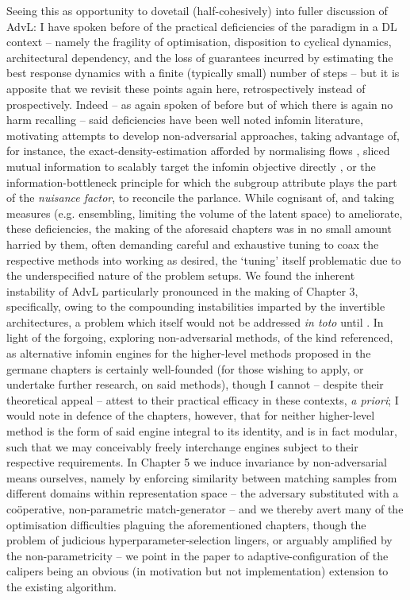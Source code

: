 %
Seeing this as opportunity to dovetail (half-cohesively) into fuller discussion of AdvL: I have
spoken before of the practical deficiencies of the paradigm in a DL context -- namely the fragility
of optimisation, disposition to cyclical dynamics, architectural dependency, and the loss of
guarantees incurred by estimating the best response dynamics with a finite (typically small) number
of steps -- but it is apposite that we revisit these points again here, retrospectively instead of
prospectively.
%
Indeed -- as again spoken of before but of which there is again no harm recalling -- said
deficiencies have been well noted infomin literature, motivating attempts to develop
non-adversarial approaches, taking advantage of, for instance, the exact-density-estimation
afforded by normalising flows \citep{balunovic2021fair}, sliced mutual information
\citep{goldfeld2021sliced} to scalably target the infomin objective directly
\citep{chen2022scalable}, or the information-bottleneck principle \citep{tishby2015deep,
moyer2018invariant} for which the subgroup attribute plays the part of the \emph{nuisance factor},
to reconcile the parlance.
%
While cognisant of, and taking measures (e.g. ensembling, limiting the volume of the latent space)
to ameliorate, these deficiencies, the making of the aforesaid chapters was in no small amount
harried by them, often demanding careful and exhaustive tuning to coax the respective methods into
working as desired, the `tuning' itself problematic due to the underspecified nature of the problem
setups.
%
We found the inherent instability of AdvL particularly pronounced in the making of Chapter 3,
specifically, owing to the compounding instabilities imparted by the invertible architectures, a
problem which itself would not be addressed \emph{in toto} until \cite{behrmann2021understanding}.
%
In light of the forgoing, exploring non-adversarial methods, of the kind referenced, as alternative
infomin engines for the higher-level methods proposed in the germane chapters is certainly
well-founded (for those wishing to apply, or undertake further research, on said methods), though I
cannot -- despite their theoretical appeal -- attest to their practical efficacy in these contexts,
\emph{a priori}; I would note in defence of the chapters, however, that for neither higher-level
method is the form of said engine integral to its identity, and is in fact modular, such that we
may conceivably freely interchange engines subject to their respective requirements.
%
In Chapter 5 we induce invariance by non-adversarial means ourselves, namely by enforcing
similarity between matching samples from different domains within representation space -- the
adversary substituted with a co\"operative, non-parametric match-generator -- and we thereby avert
many of the optimisation difficulties plaguing the aforementioned chapters, though the problem of
judicious hyperparameter-selection lingers, or arguably amplified by the non-parametricity -- we
point in the paper to adaptive-configuration of the calipers being an obvious (in motivation but
not implementation) extension to the existing algorithm.
%

